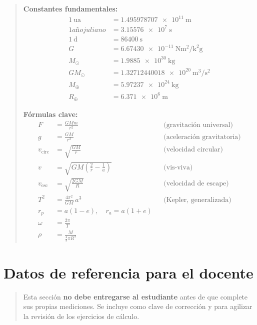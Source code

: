 \documentclass[11pt,a4paper]{article}
\newenvironment{cajaTeoria}{\begin{quote}\small}{\end{quote}}
\newenvironment{cajaImportante}{\begin{quote}\small}{\end{quote}}
\theoremstyle{definition}
\newcommand{\Msun}{\ensuremath{M_{\odot}}}
\newcommand{\Mearth}{\ensuremath{M_{\oplus}}}
\newcommand{\Rearth}{\ensuremath{R_{\oplus}}}
\newcommand{\GMsun}{\ensuremath{GM_{\odot}}}
\newcommand{\velesc}{\ensuremath{v_{\text{esc}}}}
\begin{document}
\begin{cajaTeoria}
\textbf{Constantes fundamentales:}
\begin{align*}
  \SI{1}{\astronomicalunit} &= \SI{1.495978707e11}{\metre} \\
  1 año juliano             &= \SI{3.15576e7}{\second} \\
  \SI{1}{\day}              &= \SI{86400}{\second} \\
  G                         &= \SI{6.67430e-11}{\newton\square\metre\per\square\kilo\gram} \\
  \Msun                     &= \SI{1.9885e30}{\kilo\gram} \\
  \GMsun                    &= \SI{1.32712440018e20}{\cubic\metre\per\square\second} \\
  \Mearth                   &= \SI{5.97237e24}{\kilo\gram} \\
  \Rearth                   &= \SI{6.371e6}{\metre}
\end{align*}

\textbf{Fórmulas clave:}
\begin{align*}
  F &= \frac{GMm}{r^{2}} & &\text{(gravitación universal)} \\
  g &= \frac{GM}{r^{2}} & &\text{(aceleración gravitatoria)} \\
  v_{\text{circ}} &= \sqrt{\frac{GM}{r}} & &\text{(velocidad circular)} \\
  v &= \sqrt{GM\left(\frac{2}{r} - \frac{1}{a}\right)} & &\text{(vis-viva)} \\
  \velesc &= \sqrt{\frac{2GM}{R}} & &\text{(velocidad de escape)} \\
  T^{2} &= \frac{4\pi^{2}}{GM}\,a^{3} & &\text{(Kepler, generalizada)} \\
  r_{p} &= a(1-e), \quad r_{a} = a(1+e) & & \\
  \omega &= \frac{2\pi}{T} & & \\
  \rho &= \frac{M}{\tfrac{4}{3}\pi R^{3}} & &
\end{align*}
\end{cajaTeoria}

\section{Datos de referencia para el docente}\label{ap:datos}

\begin{cajaImportante}
Esta sección \textbf{no debe entregarse al estudiante} antes de que complete sus propias mediciones. Se incluye como clave de corrección y para agilizar la revisión de los ejercicios de cálculo.
\end{cajaImportante}
\end{document}
